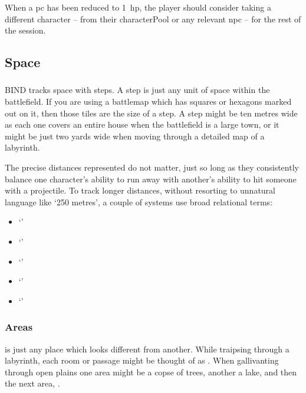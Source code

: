 \begin{multicols}{2}
When a \gls{pc} has been reduced to 1~\gls{hp}, the player should consider taking a different character -- from their \gls{characterPool} or any relevant \gls{npc} -- for the rest of the session.

\subsection{Space}
\label{space}

\subsubsection{}

BIND tracks space with \glspl{step}.
A \gls{step} is just any unit of space within the battlefield.
If you are using a battlemap which has squares or hexagons marked out on it, then those tiles are the size of a step.
A step might be ten metres wide as each one covers an entire house when the battlefield is a large town, or it might be just two yards wide when moving through a detailed map of a labyrinth.

The precise distances represented do not matter, just so long as they consistently balance one character's ability to run away with another's ability to hit someone with a projectile.
To track longer distances, without resorting to unnatural language like `250 metres', a couple of systems use broad relational terms:

\null
\setcounter{spellCost}{2}
\begin{itemize}
  \item
  \toggletrue{Distant}
  \setRange{}
  `\spellRange'
  \item
  \setRange{}
  `\spellRange'
  \item
  \setRange{}
  `\spellRange'
  \item
  \setRange{}
  `\spellRange'
  \item
  \setRange{}
  `\spellRange'
\end{itemize}

\subsubsection{Areas}

 is just any place which looks different from another.
While traipsing through a labyrinth, each room or passage might be thought of as .
When gallivanting through open plains one \gls{area} might be a copse of trees, another a lake, and then the next area, .


\end{multicols}
